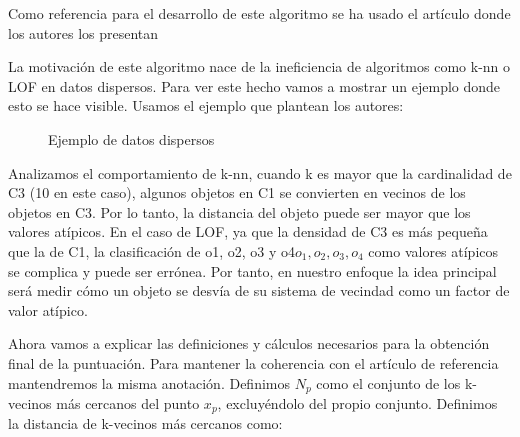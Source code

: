 Como referencia para el desarrollo de este algoritmo 
se ha usado el artículo donde los autores los presentan \cite{zhangNewLocalDistancebased2009}

La motivación de este algoritmo nace de la ineficiencia de algoritmos como
k-nn o LOF en datos dispersos. Para ver este hecho vamos a mostrar un ejemplo
donde esto se hace visible. Usamos el ejemplo que plantean los autores:

\begin{figure}[h]
    \caption{\label{fig:datos-dispersos} Ejemplo de datos dispersos}
\end{figure}

Analizamos el comportamiento de k-nn, cuando k es mayor 
que la cardinalidad de C3 (10 en este caso), algunos objetos en C1 se 
convierten en vecinos de los objetos en C3. Por lo tanto, la distancia 
del objeto puede ser mayor que los valores atípicos.
En el caso de LOF, ya que la densidad de C3 es más pequeña que la de C1,
la clasificación de o1, o2, o3 y o4$o_1, o_2, o_3, o_4$ 
como valores atípicos se complica y puede ser errónea.
Por tanto, en nuestro enfoque la idea principal será medir cómo 
un objeto se desvía de su sistema de vecindad como un factor de valor 
atípico.


Ahora vamos a explicar las definiciones y cálculos necesarios para la obtención
final de la puntuación. Para mantener la coherencia con el artículo de referencia
mantendremos la misma anotación. Definimos $N_p$ como el conjunto de los k-vecinos
más cercanos del punto $x_p$, excluyéndolo del propio conjunto. Definimos
la distancia de k-vecinos más cercanos como:


